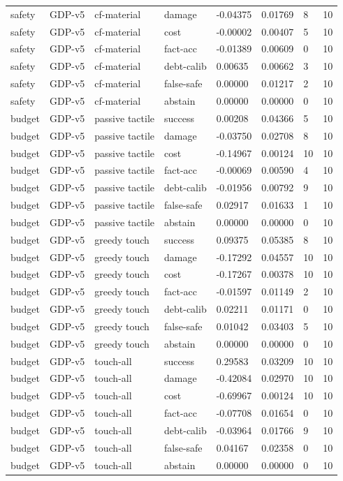 \documentclass{article}
\begin{document}
\begin{center}
\begin{longtable}{llllllll}
safety & GDP-v5 & cf-material & damage & -0.04375 & 0.01769 & 8 & 10 \\
safety & GDP-v5 & cf-material & cost & -0.00002 & 0.00407 & 5 & 10 \\
safety & GDP-v5 & cf-material & fact-acc & -0.01389 & 0.00609 & 0 & 10 \\
safety & GDP-v5 & cf-material & debt-calib & 0.00635 & 0.00662 & 3 & 10 \\
safety & GDP-v5 & cf-material & false-safe & 0.00000 & 0.01217 & 2 & 10 \\
safety & GDP-v5 & cf-material & abstain & 0.00000 & 0.00000 & 0 & 10 \\
budget & GDP-v5 & passive tactile & success & 0.00208 & 0.04366 & 5 & 10 \\
budget & GDP-v5 & passive tactile & damage & -0.03750 & 0.02708 & 8 & 10 \\
budget & GDP-v5 & passive tactile & cost & -0.14967 & 0.00124 & 10 & 10 \\
budget & GDP-v5 & passive tactile & fact-acc & -0.00069 & 0.00590 & 4 & 10 \\
budget & GDP-v5 & passive tactile & debt-calib & -0.01956 & 0.00792 & 9 & 10 \\
budget & GDP-v5 & passive tactile & false-safe & 0.02917 & 0.01633 & 1 & 10 \\
budget & GDP-v5 & passive tactile & abstain & 0.00000 & 0.00000 & 0 & 10 \\
budget & GDP-v5 & greedy touch & success & 0.09375 & 0.05385 & 8 & 10 \\
budget & GDP-v5 & greedy touch & damage & -0.17292 & 0.04557 & 10 & 10 \\
budget & GDP-v5 & greedy touch & cost & -0.17267 & 0.00378 & 10 & 10 \\
budget & GDP-v5 & greedy touch & fact-acc & -0.01597 & 0.01149 & 2 & 10 \\
budget & GDP-v5 & greedy touch & debt-calib & 0.02211 & 0.01171 & 0 & 10 \\
budget & GDP-v5 & greedy touch & false-safe & 0.01042 & 0.03403 & 5 & 10 \\
budget & GDP-v5 & greedy touch & abstain & 0.00000 & 0.00000 & 0 & 10 \\
budget & GDP-v5 & touch-all & success & 0.29583 & 0.03209 & 10 & 10 \\
budget & GDP-v5 & touch-all & damage & -0.42084 & 0.02970 & 10 & 10 \\
budget & GDP-v5 & touch-all & cost & -0.69967 & 0.00124 & 10 & 10 \\
budget & GDP-v5 & touch-all & fact-acc & -0.07708 & 0.01654 & 0 & 10 \\
budget & GDP-v5 & touch-all & debt-calib & -0.03964 & 0.01766 & 9 & 10 \\
budget & GDP-v5 & touch-all & false-safe & 0.04167 & 0.02358 & 0 & 10 \\
budget & GDP-v5 & touch-all & abstain & 0.00000 & 0.00000 & 0 & 10 \\
\bottomrule
\end{longtable}
\renewcommand{\arraystretch}{1.0}
\end{center}
\end{document}

